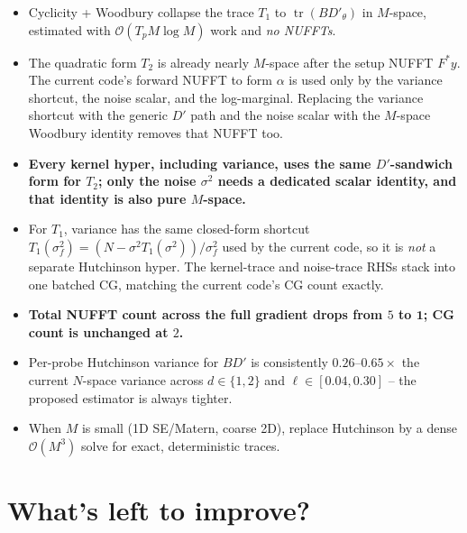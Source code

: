 \documentclass[11pt]{article}
\newcommand{\tr}{\operatorname{tr}}
\newcommand{\bigo}{\mathcal{O}}
\begin{document}
\begin{itemize}
\item Cyclicity + Woodbury collapse the trace $T_1$ to $\tr(BD'_\theta)$ in $M$-space, estimated with $\bigo(T_p M\log M)$ work and \emph{no NUFFTs}.
\item The quadratic form $T_2$ is already nearly $M$-space after the setup NUFFT $F^*y$. The current code's forward NUFFT to form $\alpha$ is used only by the variance shortcut, the noise scalar, and the log-marginal. Replacing the variance shortcut with the generic $D'$ path and the noise scalar with the $M$-space Woodbury identity removes that NUFFT too.
\item \textbf{Every kernel hyper, including variance, uses the same $D'$-sandwich form for $T_2$; only the noise $\sigma^2$ needs a dedicated scalar identity, and that identity is also pure $M$-space.}
\item For $T_1$, variance has the same closed-form shortcut $T_1(\sigma_f^2) = (N - \sigma^2 T_1(\sigma^2))/\sigma_f^2$ used by the current code, so it is \emph{not} a separate Hutchinson hyper. The kernel-trace and noise-trace RHSs stack into one batched CG, matching the current code's CG count exactly.
\item \textbf{Total NUFFT count across the full gradient drops from $5$ to $\mathbf{1}$; CG count is unchanged at $2$.}
\item Per-probe Hutchinson variance for $BD'$ is consistently $0.26$--$0.65\times$ the current $N$-space variance across $d\in\{1,2\}$ and $\ell\in[0.04, 0.30]$ -- the proposed estimator is always tighter.
\item When $M$ is small (1D SE/Matern, coarse 2D), replace Hutchinson by a dense $\bigo(M^3)$ solve for exact, deterministic traces.
\end{itemize}

\section{What's left to improve?}
\end{document}
